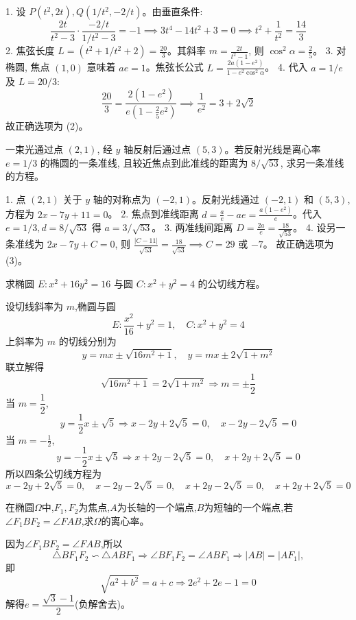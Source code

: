 \begin{questions}
\begin{solution}
1. 设 $P(t^2, 2t), Q(1/t^2, -2/t)$。由垂直条件:
\[ \frac{2t}{t^2-3} \cdot \frac{-2/t}{1/t^2-3} = -1 \implies 3t^4 - 14t^2 + 3 = 0 \implies t^2 + \frac{1}{t^2} = \frac{14}{3} \]
2. 焦弦长度 $L = (t^2+1/t^2+2) = \frac{20}{3}$。其斜率 $m = \frac{2t}{t^2-1}$, 则 $\cos^2\alpha = \frac{2}{5}$。
3. 对椭圆, 焦点 $(1,0)$ 意味着 $ae=1$。焦弦长公式 $L = \frac{2a(1-e^2)}{1-e^2\cos^2\alpha}$。
4. 代入 $a = 1/e$ 及 $L = 20/3$:
\[ \frac{20}{3} = \frac{2(1-e^2)}{e(1 - \frac{2}{5}e^2)} \implies \frac{1}{e^2} = 3 + 2\sqrt{2} \]
故正确选项为 (2)。
\end{solution}

\question
一束光通过点 $(2, 1)$, 经 $y$ 轴反射后通过点 $(5, 3)$。若反射光线是离心率 $e=1/3$ 的椭圆的一条准线, 且较近焦点到此准线的距离为 $8/\sqrt{53}$, 求另一条准线的方程。

\begin{solution}
1. 点 $(2,1)$ 关于 $y$ 轴的对称点为 $(-2,1)$。反射光线通过 $(-2,1)$ 和 $(5,3)$, 方程为 $2x - 7y + 11 = 0$。
2. 焦点到准线距离 $d = \frac{a}{e} - ae = \frac{a(1-e^2)}{e}$。代入 $e=1/3, d=8/\sqrt{53}$ 得 $a = 3/\sqrt{53}$。
3. 两准线间距离 $D = \frac{2a}{e} = \frac{18}{\sqrt{53}}$。
4. 设另一条准线为 $2x - 7y + C = 0$, 则 $\frac{|C-11|}{\sqrt{53}} = \frac{18}{\sqrt{53}} \implies C = 29$ 或 $-7$。
故正确选项为 (3)。
\end{solution}
    \question 求椭圆 $E: x^2 + 16y^2 = 16$ 与圆 $C: x^2 + y^2 = 4$ 的公切线方程。
    \begin{solution}
        设切线斜率为 $m$,椭圆与圆
        \[
        E: \frac{x^2}{16} + y^2 = 1, \quad C: x^2 + y^2 = 4
        \]
        上斜率为 $m$ 的切线分别为
        \[
        y = mx \pm \sqrt{16m^2 + 1},\quad y = mx \pm 2\sqrt{1+m^2}
        \]
        联立解得
        \[
        \sqrt{16m^2 + 1} = 2\sqrt{1+m^2} \Rightarrow m = \pm \frac{1}{2}
        \]
        当 $m = \dfrac{1}{2}$,
        \[
        y = \frac{1}{2}x \pm \sqrt{5} \Rightarrow x - 2y + 2\sqrt{5} = 0, \quad x - 2y - 2\sqrt{5} = 0
        \]
        当 $m = -\frac{1}{2}$,
        \[
        y = -\frac{1}{2}x \pm \sqrt{5} \Rightarrow x + 2y - 2\sqrt{5} = 0, \quad x + 2y + 2\sqrt{5} = 0
        \]
        所以四条公切线方程为
        \[
        x - 2y + 2\sqrt{5} = 0, \quad x - 2y - 2\sqrt{5} = 0, \quad x + 2y - 2\sqrt{5} = 0, \quad x + 2y + 2\sqrt{5} = 0
        \]
    \end{solution}

    \question 在椭圆$\Omega$中,$F_1, F_2$为焦点,$A$为长轴的一个端点,$B$为短轴的一个端点,若$\angle F_1BF_2 = \angle FAB$,求$\Omega$的离心率。
    \begin{solution}
        因为$\angle F_1BF_2 = \angle FAB$,所以
        \[
        \triangle BF_1F_2 \backsim \triangle ABF_1\Rightarrow\angle BF_1F_2 = \angle ABF_1\Rightarrow|AB| = |AF_1|,
        \]
        即
        \[
        \sqrt{a^2+b^2}=a+c\Rightarrow2e^2+2e-1=0
        \]
        解得$e=\dfrac{\sqrt{3}-1}{2}$(负解舍去)。
    \end{solution}
    

\end{questions}
